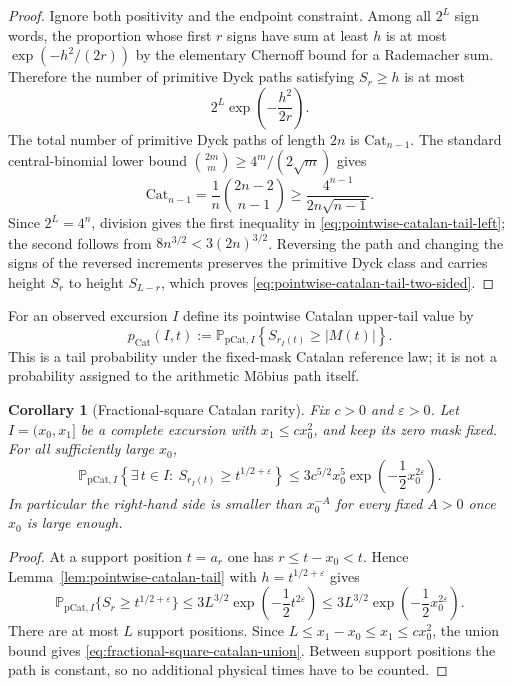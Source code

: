 \documentclass[11pt]{amsart}
\numberwithin{equation}{section}
\theoremstyle{plain}
\newtheorem{corollary}[theorem]{Corollary}
\theoremstyle{definition}
\theoremstyle{remark}
\newcommand{\eps}{\varepsilon}
\begin{document}
\begin{proof}
Ignore both positivity and the endpoint constraint.  Among all $2^L$ sign
words, the proportion whose first $r$ signs have sum at least $h$ is at most
$\exp(-h^2/(2r))$ by the elementary Chernoff bound for a Rademacher sum.
Therefore the number of primitive Dyck paths satisfying $S_r\ge h$ is at
most
\[
 2^L\exp\!\left(-\frac{h^2}{2r}\right).
\]
The total number of primitive Dyck paths of length $2n$ is $\mathrm{Cat}_{n-1}$.  The
standard central-binomial lower bound
$\binom{2m}{m}\ge4^m/(2\sqrt m)$ gives
\[
 \mathrm{Cat}_{n-1}=\frac1n\binom{2n-2}{n-1}
 \ge\frac{4^{n-1}}{2n\sqrt{n-1}}.
\]
Since $2^L=4^n$, division gives the first inequality in
\eqref{eq:pointwise-catalan-tail-left}; the second follows from
$8n^{3/2}<3(2n)^{3/2}$.  Reversing the path and changing the signs of the
reversed increments preserves the primitive Dyck class and carries height
$S_r$ to height $S_{L-r}$, which proves
\eqref{eq:pointwise-catalan-tail-two-sided}.
\end{proof}

For an observed excursion $I$ define its pointwise Catalan upper-tail value
by
\begin{equation}
\label{eq:pointwise-catalan-pvalue}
 p_{\mathrm{Cat}}(I,t):=
 \mathbb P_{\mathrm{pCat},I}
 \left\{S_{r_I(t)}\ge |M(t)|\right\}.
\end{equation}
This is a tail probability under the fixed-mask Catalan reference law; it is
not a probability assigned to the arithmetic M\"obius path itself.

\begin{corollary}[Fractional-square Catalan rarity]
\label{cor:fractional-square-catalan-rarity}
Fix $c>0$ and $\eps>0$.  Let $I=(x_0,x_1]$ be a complete excursion with
$x_1\le cx_0^2$, and keep its zero mask fixed.  For all sufficiently large
$x_0$,
\begin{equation}
\label{eq:fractional-square-catalan-union}
 \mathbb P_{\mathrm{pCat},I}
 \left\{\exists\,t\in I:\ S_{r_I(t)}\ge t^{1/2+\eps}\right\}
 \le 3c^{5/2}x_0^5
 \exp\!\left(-\frac12x_0^{2\eps}\right).
\end{equation}
In particular the right-hand side is smaller than $x_0^{-A}$ for every
fixed $A>0$ once $x_0$ is large enough.
\end{corollary}

\begin{proof}
At a support position $t=a_r$ one has $r\le t-x_0<t$.  Hence
Lemma~\ref{lem:pointwise-catalan-tail} with $h=t^{1/2+\eps}$ gives
\[
 \mathbb P_{\mathrm{pCat},I}\{S_r\ge t^{1/2+\eps}\}
 \le3L^{3/2}\exp\!\left(-\frac12t^{2\eps}\right)
 \le3L^{3/2}\exp\!\left(-\frac12x_0^{2\eps}\right).
\]
There are at most $L$ support positions.  Since
$L\le x_1-x_0\le x_1\le cx_0^2$, the union bound gives
\eqref{eq:fractional-square-catalan-union}.  Between support positions the
path is constant, so no additional physical times have to be counted.
\end{proof}
\end{document}
